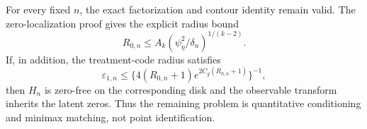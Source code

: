 For every fixed \(n\), the exact factorization and contour identity remain valid.  The zero-localization proof gives the explicit radius bound
\[
 R_{0,n}\le A_k(\psi_{\eta}^2/\delta_n)^{1/(k-2)}.
\]
If, in addition, the treatment-code radius satisfies
\[
 \varepsilon_{1,n}\le\{4(R_{0,n}+1)e^{2C_g(R_{0,n}+1)}\}^{-1},
\]
then \(H_n\) is zero-free on the corresponding disk and the observable transform inherits the latent zeros.  Thus the remaining problem is quantitative conditioning and minimax matching, not point identification.